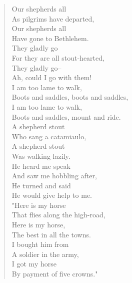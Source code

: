 
\begin{verse}
Our shepherds all\\
\hspace*{2em}As pilgrims have departed,\\
Our shepherds all\\
\hspace*{2em}Have gone to Bethlehem.\\
They gladly go\\
\hspace*{2em}For they are all stout-hearted,\\
They gladly go--\\
\hspace*{2em}Ah, could I go with them!\\[0.7em]

\hspace*{2em}I am too lame to walk,\\
\hspace*{4em}Boots and saddles, boots and saddles,\\
\hspace*{2em}I am too lame to walk,\\
\hspace*{4em}Boots and saddles, mount and ride.\\[0.7em]

A shepherd stout\\
\hspace*{2em}Who sang a catamiaulo,\\
A shepherd stout\\
\hspace*{2em}Was walking lazily.\\
He heard me speak\\
\hspace*{2em}And saw me hobbling after,\\
He turned and said\\
\hspace*{2em}He would give help to me.\\[0.7em]

"Here is my horse\\
\hspace*{2em}That flies along the high-road,\\
Here is my horse,\\
\hspace*{2em}The best in all the towns.\\
I bought him from\\
\hspace*{2em}A soldier in the army,\\
I got my horse\\
\hspace*{2em}By payment of five crowns."\\[0.7em]


\end{verse}
